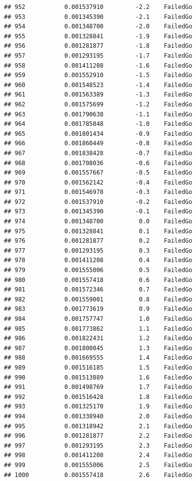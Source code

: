 \documentclass[
]{article}
\begin{document}
\begin{verbatim}
## 952           0.001537910         -2.2    FailedGo
## 953           0.001345390         -2.1    FailedGo
## 954           0.001348700         -2.0    FailedGo
## 955           0.001328841         -1.9    FailedGo
## 956           0.001281877         -1.8    FailedGo
## 957           0.001293195         -1.7    FailedGo
## 958           0.001411208         -1.6    FailedGo
## 959           0.001552910         -1.5    FailedGo
## 960           0.001548523         -1.4    FailedGo
## 961           0.001563389         -1.3    FailedGo
## 962           0.001575699         -1.2    FailedGo
## 963           0.001790638         -1.1    FailedGo
## 964           0.001785848         -1.0    FailedGo
## 965           0.001801434         -0.9    FailedGo
## 966           0.001860449         -0.8    FailedGo
## 967           0.001838428         -0.7    FailedGo
## 968           0.001708036         -0.6    FailedGo
## 969           0.001557667         -0.5    FailedGo
## 970           0.001562142         -0.4    FailedGo
## 971           0.001546978         -0.3    FailedGo
## 972           0.001537910         -0.2    FailedGo
## 973           0.001345390         -0.1    FailedGo
## 974           0.001348700          0.0    FailedGo
## 975           0.001328841          0.1    FailedGo
## 976           0.001281877          0.2    FailedGo
## 977           0.001293195          0.3    FailedGo
## 978           0.001411208          0.4    FailedGo
## 979           0.001555006          0.5    FailedGo
## 980           0.001557418          0.6    FailedGo
## 981           0.001572346          0.7    FailedGo
## 982           0.001559001          0.8    FailedGo
## 983           0.001773619          0.9    FailedGo
## 984           0.001757747          1.0    FailedGo
## 985           0.001773862          1.1    FailedGo
## 986           0.001822431          1.2    FailedGo
## 987           0.001800845          1.3    FailedGo
## 988           0.001669555          1.4    FailedGo
## 989           0.001516185          1.5    FailedGo
## 990           0.001513889          1.6    FailedGo
## 991           0.001498769          1.7    FailedGo
## 992           0.001516428          1.8    FailedGo
## 993           0.001325170          1.9    FailedGo
## 994           0.001338940          2.0    FailedGo
## 995           0.001318942          2.1    FailedGo
## 996           0.001281877          2.2    FailedGo
## 997           0.001293195          2.3    FailedGo
## 998           0.001411208          2.4    FailedGo
## 999           0.001555006          2.5    FailedGo
## 1000          0.001557418          2.6    FailedGo

\end{verbatim}
\end{document}
